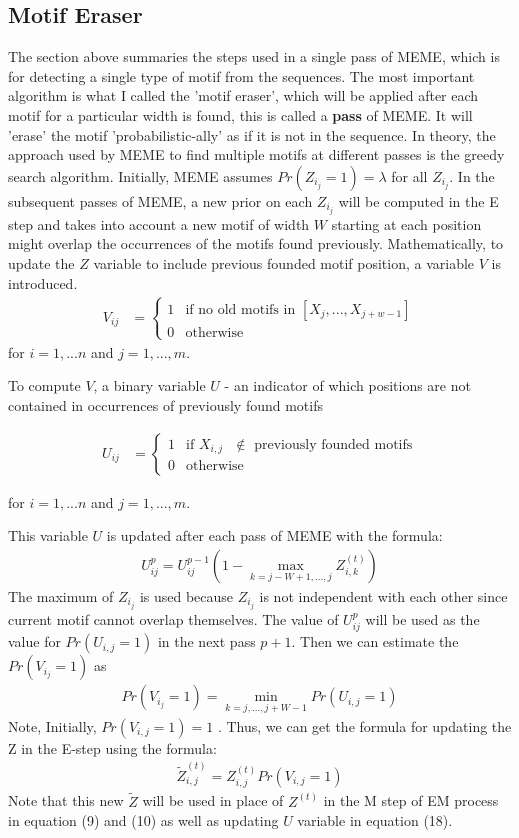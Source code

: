 \documentclass{article}
\begin{document}
\subsection{Motif Eraser}
The section above summaries the steps used in a single pass of MEME, which is for detecting a single type of motif from the sequences. The most important algorithm is what I called the 'motif eraser', which will be applied after each motif for a particular width is found, this is called a \textbf{pass} of MEME. It will 'erase' the motif 'probabilistic-ally' as if it is not in the sequence. In theory, the approach used by MEME to find multiple motifs at different passes is the greedy search algorithm. Initially, MEME assumes $Pr(Z_i_j=1)=\lambda$ for all $Z_i_j$. In the subsequent passes of MEME, a new prior on each $Z_i_j$ will be computed in the E step and takes into account a new motif of width $W$ starting at each position might overlap the occurrences of the motifs found previously.
Mathematically, to update the $Z$ variable to include previous founded motif position, a variable $V$ is introduced. 
\begin{align}
V_{ij} &=    \begin{cases}
      1 & \text{if no old motifs in $[X_j,...,X_{j+w-1}]$}\\
      0 & \text{otherwise}
      \end{cases}
\end{align}
for $i=1,...n$ and $j=1,...,m$.

To compute $V$, a binary variable $U$ - an indicator of which positions are not contained in occurrences of previously found motifs

\begin{align}
U_{ij} &=    \begin{cases}
      1 & \text{if $X_{i,j}$ $\notin$ previously founded motifs}\\
      0 & \text{otherwise}
  \end{cases}
\end{align}

for $i=1,...n$ and $j=1,...,m$.

This variable $U$ is updated after each pass of MEME with the formula:
\begin{align}
U_{ij}^{p} =U_{ij}^{p-1}(1- \max_{k={j-W+1,...,j}}{Z_{i,k}^{(t)}})
\end{align}
The maximum of $Z_i_j$ is used because $Z_i_j$ is not independent with each other since current motif cannot overlap themselves. The value of $U_{ij}^{p}$ will be used as the value for $Pr(U_{i,j}=1)$ in the next pass $p+1$. Then we can estimate the $Pr(V_i_j=1)$ as
\begin{align}
Pr(V_i_j=1) =\min_{k={j,...,j+W-1}}{Pr(U_{i,j}=1)}
\end{align}
Note, Initially, $Pr(V_{i,j}=1)=1$ . Thus, we can get the formula for updating the Z in the E-step using the formula:
\begin{align}
\tilde{Z}^{(t)}_{i,j}=Z^{(t)}_{i,j}{Pr(V_{i,j}=1)}
\end{align}
Note that this new $\tilde{Z}$ will be used in place of $Z^{(t)}$ in the M step of EM process in equation (9) and (10) as well as updating $U$ variable in equation (18).
\end{document}

